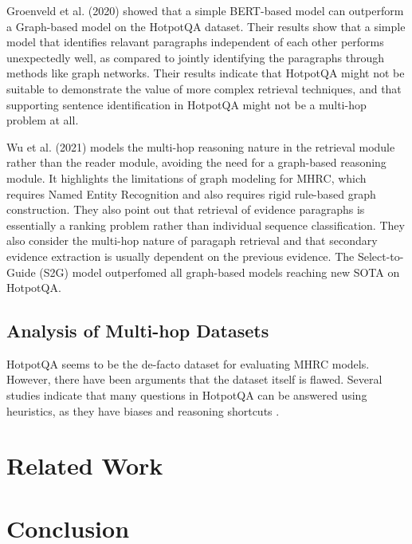 \documentclass[sigplan,screen]{acmart}
\begin{document}
Groenveld et al. (2020) \cite{RN126} showed that a simple BERT-based model can outperform a Graph-based model on the HotpotQA dataset.
Their results show that a simple model that identifies relavant paragraphs independent of each other performs unexpectedly well, as compared to 
jointly identifying the paragraphs through methods like graph networks. Their results indicate that HotpotQA might not be suitable to demonstrate the 
value of more complex retrieval techniques, and that supporting sentence identification in HotpotQA might not be a multi-hop problem at all.

Wu et al. (2021) \cite{RN106} models the multi-hop reasoning nature in the retrieval module rather than the reader module, avoiding the need for a graph-based reasoning module.
It highlights the limitations of graph modeling for MHRC, which requires Named Entity Recognition and also requires rigid rule-based graph construction.
They also point out that retrieval of evidence paragraphs is essentially a ranking problem rather than individual sequence classification.
They also consider the multi-hop nature of paragaph retrieval and that secondary evidence extraction is usually dependent on the previous evidence.
The Select-to-Guide (S2G) model outperfomed all graph-based models reaching new SOTA on HotpotQA.



\subsection{Analysis of Multi-hop Datasets}

HotpotQA seems to be the de-facto dataset for evaluating MHRC models. However, there have been arguments that the dataset itself is flawed. 
Several studies \cite{RN176} \cite{RN175} \cite{RN154} \cite{RN150} indicate that many questions in HotpotQA can be answered using heuristics, as they 
have biases and reasoning shortcuts \cite{RN177}.



\section{Related Work}

\section{Conclusion}



\end{document}
